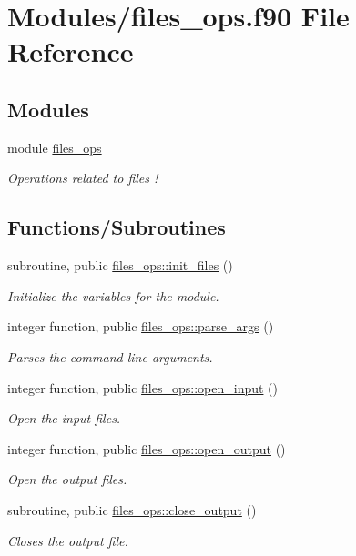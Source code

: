 \hypertarget{files__ops_8f90}{}\section{Modules/files\+\_\+ops.f90 File Reference}
\label{files__ops_8f90}
\subsection*{Modules}
\begin{DoxyCompactItemize}
\item 
module \hyperlink{namespacefiles__ops}{files\+\_\+ops}
\begin{DoxyCompactList}\small\item\em Operations related to files ! \end{DoxyCompactList}\end{DoxyCompactItemize}
\subsection*{Functions/\+Subroutines}
\begin{DoxyCompactItemize}
\item 
subroutine, public \hyperlink{namespacefiles__ops_a1e219b1147f109f758d03bef89d540e8}{files\+\_\+ops\+::init\+\_\+files} ()
\begin{DoxyCompactList}\small\item\em Initialize the variables for the module. \end{DoxyCompactList}\item 
integer function, public \hyperlink{namespacefiles__ops_a051584112f6e4f6e60b0ef824dffbf5e}{files\+\_\+ops\+::parse\+\_\+args} ()
\begin{DoxyCompactList}\small\item\em Parses the command line arguments. \end{DoxyCompactList}\item 
integer function, public \hyperlink{namespacefiles__ops_a63a81a5a451f787025429878b2cec81b}{files\+\_\+ops\+::open\+\_\+input} ()
\begin{DoxyCompactList}\small\item\em Open the input files. \end{DoxyCompactList}\item 
integer function, public \hyperlink{namespacefiles__ops_ad681a9e8083a6f664cf0f9d17ebe279c}{files\+\_\+ops\+::open\+\_\+output} ()
\begin{DoxyCompactList}\small\item\em Open the output files. \end{DoxyCompactList}\item 
subroutine, public \hyperlink{namespacefiles__ops_a239cc017150e54eda19a8ccb0ff191cd}{files\+\_\+ops\+::close\+\_\+output} ()
\begin{DoxyCompactList}\small\item\em Closes the output file. \end{DoxyCompactList}\end{DoxyCompactItemize}

